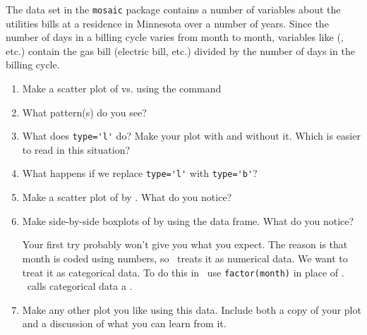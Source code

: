 \begin{problem}
The  data set in the \verb!mosaic! package contains a number of variables
about the utilities bills at a residence in Minnesota over a number of years.
Since the number of days in a billing cycle varies from month to month, variables 
like  (, etc.) contain the gas bill (electric bill, etc.) 
divided by the number of days in the billing cycle.
\begin{enumerate}
\item
Make a scatter plot of  vs.  using the command
\begin{knitrout}
\end{knitrout}

\item[]
What pattern(s) do you see?
\item
What does \verb!type='l'! do?  Make your plot with and without it.  Which is easier to read
in this situation?
\item
What happens if we replace 
\verb!type='l'! with 
\verb!type='b'!?
\item
Make a scatter plot of  by .   
What do you notice?

\item
Make side-by-side boxplots of  by  using the 
data frame.   
What do you notice?

Your first try probably won't give you what you expect.  The reason is that month is coded
using numbers, so \R\ treats it as numerical data.  We want to treat it as categorical data.
To do this in \R\, use \verb!factor(month)! in place of .  
\R\ calls categorical data a .

\item
Make any other plot you like using this data.  Include both a copy of your plot and a 
discussion of what you can learn from it.
\end{enumerate}
\end{problem}

